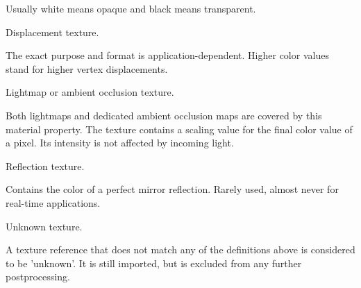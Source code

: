 \begin{Desc}
\begin{description}
Usually white means opaque and black means transparent. \item[{\em 
\hypertarget{namespaceassimp_1_1material_a034b83e48ea4f51696e276d3d5403f1bae5823a7e2efa4d5aa81d929eeaf6c072}{D\+I\+S\+P\+L\+A\+C\+E\+M\+E\+N\+T}\label{namespaceassimp_1_1material_a034b83e48ea4f51696e276d3d5403f1bae5823a7e2efa4d5aa81d929eeaf6c072}
}]Displacement texture.

The exact purpose and format is application-\/dependent. Higher color values stand for higher vertex displacements. \item[{\em 
\hypertarget{namespaceassimp_1_1material_a034b83e48ea4f51696e276d3d5403f1bab73548e0159145054ad94d2abad83417}{L\+I\+G\+H\+T\+M\+A\+P}\label{namespaceassimp_1_1material_a034b83e48ea4f51696e276d3d5403f1bab73548e0159145054ad94d2abad83417}
}]Lightmap or ambient occlusion texture.

Both lightmaps and dedicated ambient occlusion maps are covered by this material property. The texture contains a scaling value for the final color value of a pixel. Its intensity is not affected by incoming light. \item[{\em 
\hypertarget{namespaceassimp_1_1material_a034b83e48ea4f51696e276d3d5403f1ba273ee8811d5df261e6a7c7f52efad1ec}{R\+E\+F\+L\+E\+C\+T\+I\+O\+N}\label{namespaceassimp_1_1material_a034b83e48ea4f51696e276d3d5403f1ba273ee8811d5df261e6a7c7f52efad1ec}
}]Reflection texture.

Contains the color of a perfect mirror reflection. Rarely used, almost never for real-\/time applications. \item[{\em 
\hypertarget{namespaceassimp_1_1material_a034b83e48ea4f51696e276d3d5403f1ba3e6e78b0e68bed83be847364f5825b49}{U\+N\+K\+N\+O\+W\+N}\label{namespaceassimp_1_1material_a034b83e48ea4f51696e276d3d5403f1ba3e6e78b0e68bed83be847364f5825b49}
}]Unknown texture.

A texture reference that does not match any of the definitions above is considered to be 'unknown'. It is still imported, but is excluded from any further postprocessing. \end{description}
\end{Desc}


